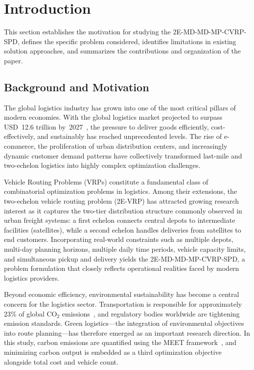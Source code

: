 \documentclass[11pt, a4paper]{article}
\numberwithin{equation}{section}
\begin{document}
\section{Introduction}
\label{sec:intro}

This section establishes the motivation for studying the 2E-MD-MD-MP-CVRP-SPD,
defines the specific problem considered, identifies limitations in existing
solution approaches, and summarizes the contributions and organization of
the paper.

\subsection{Background and Motivation}

The global logistics industry has grown into one of the most critical pillars
of modern economies.  With the global logistics market projected to surpass
USD~12.6 trillion by~2027~\cite{grandview2020}, the pressure to deliver goods
efficiently, cost-effectively, and sustainably has reached unprecedented levels.  The
rise of e-commerce, the proliferation of urban distribution centers, and
increasingly dynamic customer demand patterns have collectively transformed
last-mile and two-echelon logistics into highly complex optimization challenges.

Vehicle Routing Problems (VRPs) constitute a fundamental class of combinatorial
optimization problems in logistics.  Among their extensions, the two-echelon
vehicle routing problem (2E-VRP) has attracted growing research interest as it
captures the two-tier distribution structure commonly observed in urban freight
systems: a first echelon connects central depots to intermediate facilities
(satellites), while a second echelon handles deliveries from satellites to end
customers.  Incorporating real-world constraints such as multiple depots,
multi-day planning horizons, multiple daily time periods, vehicle capacity
limits, and simultaneous pickup and delivery yields the
2E-MD-MD-MP-CVRP-SPD, a problem formulation that closely reflects operational
realities faced by modern logistics providers.

Beyond economic efficiency, environmental sustainability has become a central
concern for the logistics sector.  Transportation is responsible for
approximately 23\% of global CO$_2$ emissions~\cite{iea2022}, and regulatory
bodies worldwide are tightening emission standards.  Green logistics---the
integration of environmental objectives into route planning---has therefore
emerged as an important research direction.  In this study, carbon emissions
are quantified using the MEET framework~\cite{hickman1999}, and minimizing
carbon output is embedded as a third optimization objective alongside total
cost and vehicle count.
\end{document}
